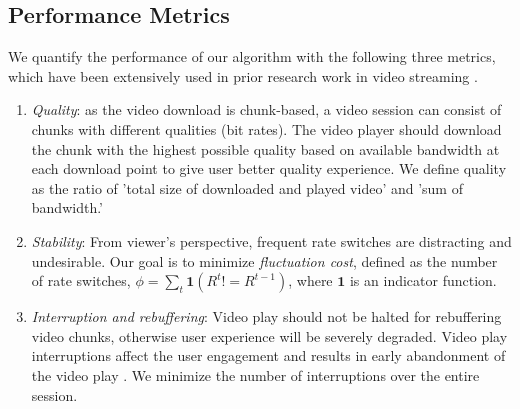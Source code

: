 \subsection{Performance Metrics}\label{subsec:metrics}


We quantify the performance of our algorithm with the following three
metrics, which have been extensively used in prior research work in video
streaming 
\cite{Qava, Avis,VideoMeasurement, Festive}. 


\begin{enumerate}
\item\textit{Quality}: as the video download is chunk-based, a video
  session can consist of chunks with different qualities (bit
  rates). The video player should download the chunk with the highest
  possible quality based on available bandwidth at each download point
  to give user better quality experience. We define quality as the
  ratio of 'total size of downloaded and played video' and 'sum of bandwidth.'

\item\textit{Stability}: From viewer's perspective, frequent rate
  switches are distracting and undesirable. Our goal is to minimize 
  \emph{fluctuation cost}, defined as the number of rate switches, $\phi= \sum\limits_t
  \mathbf{1}(R^t!=R^{t-1})$, where $\mathbf{1}$ is an indicator
  function. 


  
\item\textit{Interruption and rebuffering}: Video play should not be
  halted for rebuffering video chunks, otherwise user experience will
  be severely degraded. Video play interruptions affect the user
  engagement and results in early abandonment of the video play
  . We minimize the 
  number of interruptions over the entire session. %
\end{enumerate}

